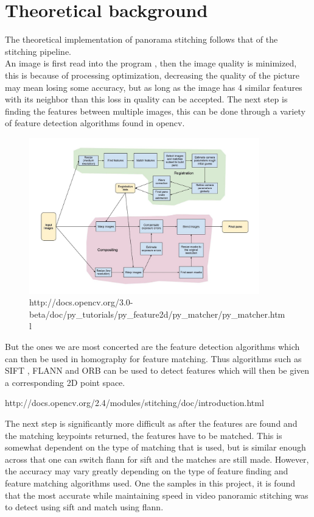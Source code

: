 \documentclass{article}
\begin{document}
\section{Theoretical background}\label{sec:overview}
The theoretical implementation of panorama stitching follows that of the stitching pipeline.\\ 
An image is first read into the program , then the image quality is minimized, this is because of processing optimization, decreasing the quality of the picture may mean losing some accuracy, but as long as the image has 4 similar features with its neighbor than this loss in quality can be accepted.
The next step is finding the features between multiple images, this can be done through a variety of feature detection algorithms found in opencv.

\begin{figure}[H]
	\centering
	\includegraphics[width=10cm]{sp.jpg}
	 \caption{http://docs.opencv.org/3.0-beta/doc/py\_tutorials/py\_feature2d/py\_matcher/py\_matcher.html}
\end{figure}





But the ones we are most concerted are the feature detection algorithms which can then be used in homography \cite{ref:homo} for feature matching. Thus algorithms such as SIFT , FLANN and ORB can be used to detect features which will then be given a corresponding 2D point space.


http://docs.opencv.org/2.4/modules/stitching/doc/introduction.html

The next step is significantly more difficult as after the features are found and the matching keypoints returned, the features have to be matched. This is somewhat dependent on the type of matching that is used, but is similar enough across that one can switch flann for sift and the matches are still made. However, the accuracy may vary greatly depending on the type of feature finding and feature matching algorithms used. One the samples in this project, it is found that the most accurate while maintaining speed in video panoramic stitching was to detect using sift and match using flann.\\
\end{document}
